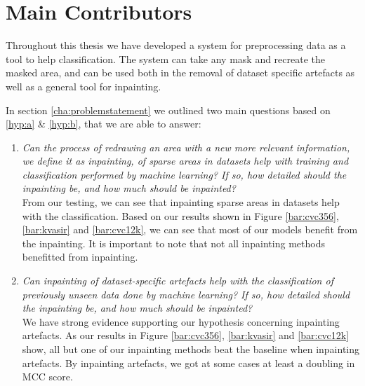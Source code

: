 \section{Main Contributors}
Throughout this thesis we have developed a system for preprocessing data as a tool to help classification. 
The system can take any mask and recreate the masked area, and can be used both in the removal of dataset specific artefacts as well as a general tool for inpainting. 

In section \ref{cha:problemstatement} we outlined two main questions based on \ref{hyp:a} \& \ref{hyp:b}, that we are able to answer:
\begin{enumerate}


\item \textit{Can the process of redrawing an area with a new more relevant information, we define it as inpainting, of sparse areas in datasets help with training and classification performed by machine learning? If so, how detailed should the inpainting be, and how much should be inpainted?}\\

From our testing, we can see that inpainting sparse areas in datasets help with the classification. Based on our results shown in Figure \ref{bar:cvc356}, \ref{bar:kvasir} and \ref{bar:cvc12k}, we can see that most of our models benefit from the inpainting. It is important to note that not all inpainting methods benefitted from inpainting.



\item \textit{Can inpainting of dataset-specific artefacts help with the classification of previously unseen data done by machine learning? If so, how detailed should the inpainting be, and how much should be inpainted?}\\


We have strong evidence supporting our hypothesis concerning inpainting artefacts. As our results in Figure \ref{bar:cvc356}, \ref{bar:kvasir} and \ref{bar:cvc12k} show, all but one of our inpainting methods beat the baseline when inpainting artefacts. By inpainting artefacts, we got at some cases at least a doubling in MCC score.



\end{enumerate}


